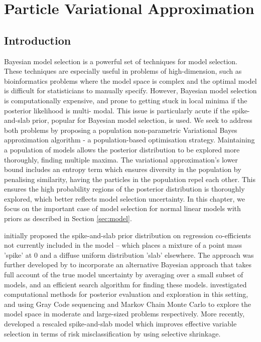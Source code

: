 \chapter{Particle Variational Approximation}

\setlength{\parindent}{0pt}

\section{Introduction}

Bayesian model selection is a powerful set of techniques for model selection. These techniques are especially
useful in problems of high-dimension, such as bioinformatics problems where the model space is complex and the
optimal model is difficult for statisticians to manually specify. However, Bayesian model selection is
computationally expensive, and prone to getting stuck in local minima if the posterior likelihood is multi-
modal. This issue is particularly acute if the spike-and-slab prior, popular for Bayesian model
selection, is used. We seek to address both problems by proposing a population non-parametric Variational
Bayes approximation algorithm - a population-based optimisation strategy. Maintaining a population of models
allows the posterior distribution to be explored more thoroughly, finding multiple maxima. The variational
approximation's lower bound includes an entropy term which ensures diversity in the population by penalising
similarity,  having the particles in the population repel each other. This ensures the high probability
regions of the posterior distribution is thoroughly explored, which better reflects model selection
uncertainty. In this chapter, we focus on the important case of model selection for normal linear models with
priors as described in Section \ref{sec:model}.

\cite{Mitchell1988} initially proposed the spike-and-slab prior distribution on regression co-efficients not
currently included in the model -- which places a mixture of a point mass 'spike' at $0$ and a diffuse uniform
distribution 'slab' elsewhere. The approach was further developed by \cite{Madigan1994} to incorporate an
alternative Bayesian approach that takes full account of the true model uncertainty by averaging over a small
subset of models, and an efficient search algorithm for finding these models. \cite{George1997} investigated
computational methods for posterior evaluation and exploration in this setting, and using Gray Code sequencing
and Markov Chain Monte Carlo to explore the model space in moderate and large-sized problems respectively.
More recently, \cite{Ishwaran2005} developed a rescaled spike-and-slab model which improves effective variable
selection in terms of risk misclassification by using selective shrinkage.

